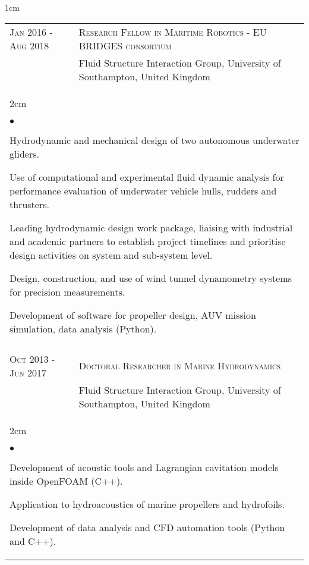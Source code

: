 \documentclass[a4paper,10pt]{article}
\newcommand{\squishlist}{
	\begin{list}{$\bullet$}
	{
		\setlength{\itemsep}{0pt}
		\setlength{\parsep}{0pt}
		\setlength{\topsep}{0pt}
		\setlength{\partopsep}{0pt}
		\setlength{\leftmargin}{2em}
		\setlength{\labelwidth}{1.5em}
		\setlength{\labelsep}{0.5em}
	}
}
\newcommand{\squishend}{\end{list}}
\begin{document}
\begin{minipage}{\textwidth}
\begin{adjustwidth}{}{1cm}
\begin{tabular}{p{3.5cm} p{12.9cm}}
\textsc{Jan 2016 - Aug 2018} & \textsc{Research Fellow in Maritime Robotics - EU BRIDGES consortium} \\
							& Fluid Structure Interaction Group, University of Southampton, United Kingdom \vspace{0.1cm} \\
%
\multicolumn{2}{l}{
\hspace{1cm}\begin{minipage}[t]{\textwidth}
\begin{adjustwidth}{}{2cm}
\squishlist
	\item Hydrodynamic and mechanical design of two autonomous underwater gliders.
	\item Use of computational and experimental fluid dynamic analysis for performance
		evaluation of underwater vehicle hulls, rudders and thrusters.
	\item Leading hydrodynamic design work package, liaising with industrial and academic
		partners to establish project timelines and prioritise design activities on system and sub-system level.
	\item Design, construction, and use of wind tunnel dynamometry systems for precision measurements.
	\item Development of software for propeller design, AUV mission simulation, data analysis (Python).
\squishend
\end{adjustwidth}
\end{minipage}
} \\
\\

\textsc{Oct 2013 - Jun 2017} & \textsc{Doctoral Researcher in Marine Hydrodynamics} \\
							& Fluid Structure Interaction Group, University of Southampton, United Kingdom \vspace{0.1cm} \\
%
\multicolumn{2}{l}{
\hspace{1cm}\begin{minipage}[t]{\textwidth}
\begin{adjustwidth}{}{2cm}
\squishlist
	\item Development of acoustic tools and Lagrangian cavitation models inside OpenFOAM (C++).
	\item Application to hydroacoustics of marine propellers and hydrofoils.
	\item Development of data analysis and CFD automation tools (Python and C++).
\squishend
\end{adjustwidth}
\end{minipage}
} \\

\end{tabular}

\end{adjustwidth}
\end{minipage}
\end{document}
